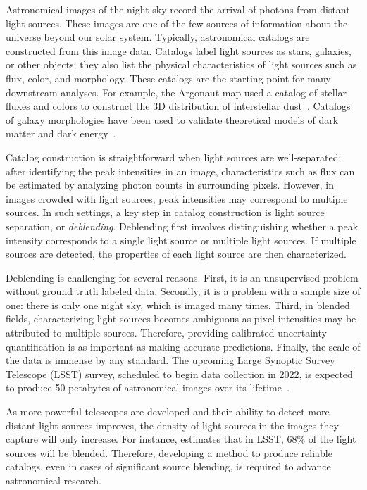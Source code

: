 Astronomical images of the night sky record the arrival of photons from distant light sources. 
These images are one of the few sources of information about the universe beyond our solar system.
Typically, astronomical catalogs are constructed from this image data.
Catalogs label light sources as stars, galaxies, or other objects; 
they also list the physical characteristics of light sources such as flux, color, and morphology. 
These catalogs are the starting point for many downstream analyses.
For example, the Argonaut map used a catalog of stellar fluxes and colors to construct the 3D distribution of interstellar dust~\cite{Green_2019_argonaut}. 
Catalogs of galaxy morphologies have been used to validate theoretical models of dark matter and dark energy~\cite{Eisenstein_2005_darkmatter}. 

Catalog construction is straightforward when light sources are well-separated: after identifying the peak intensities in an image, characteristics such as flux can be estimated by analyzing photon counts in surrounding pixels. 
However, in images crowded with light sources, peak intensities may correspond to multiple sources.
In such settings, a key step in catalog construction is light source separation, or {\itshape deblending}. 
Deblending first involves distinguishing whether a peak intensity corresponds to a single light source or multiple light sources. 
If multiple sources are detected, the properties of each light source are then characterized. 

Deblending is challenging for several reasons.
First, it is an unsupervised problem without ground truth labeled data. 
Secondly, it is a problem with a sample size of one: there is only one night sky, which is imaged many times.
Third, in blended fields, characterizing light sources becomes ambiguous as pixel intensities may be attributed to multiple sources. Therefore, providing calibrated uncertainty quantification is as important as making accurate predictions.
Finally, the scale of the data is immense by any standard. The upcoming Large Synoptic Survey Telescope (LSST) survey, scheduled to begin data collection in 2022, is expected to produce 50 petabytes of astronomical images over its lifetime~\cite{LSST_about}.

As more powerful telescopes are developed and their ability to detect more distant light sources improves, the density of light sources in the images they capture will only increase. 
For instance, \cite{Bosch_2017_LSST} estimates that in LSST, 68\% of the light sources will be blended. Therefore, developing a method to produce reliable catalogs, even in cases of significant source blending, is required to advance astronomical research. 

